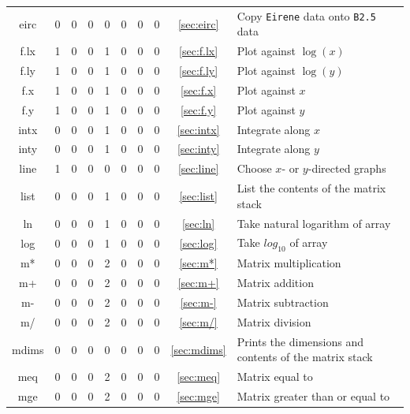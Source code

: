 \documentclass[a4paper,10pt]{report}
\begin{document}
\begin{center}
\begin{longtable}{|c|c|c|c|c|c|c|c|c|l|}
    eirc \index{b2plot, eirc}      & 0 & 0 & 0 & 0 & 0 & 0 & 0 & \ref{sec:eirc}  & Copy {\tt Eirene} data onto {\tt B2.5} data \\
    f.lx \index{b2plot, f.lx}      & 1 & 0 & 0 & 1 & 0 & 0 & 0 & \ref{sec:f.lx}  & Plot against $\log(x)$ \\
    f.ly \index{b2plot, f.ly}      & 1 & 0 & 0 & 1 & 0 & 0 & 0 & \ref{sec:f.ly}  & Plot against $\log(y)$ \\
    f.x \index{b2plot, f.x}        & 1 & 0 & 0 & 1 & 0 & 0 & 0 & \ref{sec:f.x}   & Plot against $x$ \\
    f.y \index{b2plot, f.y}        & 1 & 0 & 0 & 1 & 0 & 0 & 0 & \ref{sec:f.y}   & Plot against $y$ \\
    intx \index{b2plot, intx}      & 0 & 0 & 0 & 1 & 0 & 0 & 0 & \ref{sec:intx}  & Integrate along $x$ \\
    inty \index{b2plot, inty}      & 0 & 0 & 0 & 1 & 0 & 0 & 0 & \ref{sec:inty}  & Integrate along $y$ \\
    line \index{b2plot, line}      & 1 & 0 & 0 & 0 & 0 & 0 & 0 & \ref{sec:line}  & Choose $x$- or $y$-directed graphs \\
    list \index{b2plot, list}      & 0 & 0 & 0 & 1 & 0 & 0 & 0 & \ref{sec:list}  & List the contents of the matrix stack \\
    ln \index{b2plot, ln}          & 0 & 0 & 0 & 1 & 0 & 0 & 0 & \ref{sec:ln}    & Take natural logarithm of array \\
    log \index{b2plot, log}        & 0 & 0 & 0 & 1 & 0 & 0 & 0 & \ref{sec:log}   & Take $log_{10}$ of array \\
    m* \index{b2plot, m*}          & 0 & 0 & 0 & 2 & 0 & 0 & 0 & \ref{sec:m*}    & Matrix multiplication\\
    m+ \index{b2plot, m+}          & 0 & 0 & 0 & 2 & 0 & 0 & 0 & \ref{sec:m+}    & Matrix addition \\
    m- \index{b2plot, m-}          & 0 & 0 & 0 & 2 & 0 & 0 & 0 & \ref{sec:m-}    & Matrix subtraction \\
    m/ \index{b2plot, m/}          & 0 & 0 & 0 & 2 & 0 & 0 & 0 & \ref{sec:m/}    & Matrix division \\
    mdims \index{b2plot, mdims}    & 0 & 0 & 0 & 0 & 0 & 0 & 0 & \ref{sec:mdims} & Prints the dimensions and contents of the matrix stack \\
    meq \index{b2plot, meq}        & 0 & 0 & 0 & 2 & 0 & 0 & 0 & \ref{sec:meq}   & Matrix equal to \\
    mge \index{b2plot, mge}        & 0 & 0 & 0 & 2 & 0 & 0 & 0 & \ref{sec:mge}   & Matrix greater than or equal to \\

\end{longtable}
\end{center}
\end{document}
